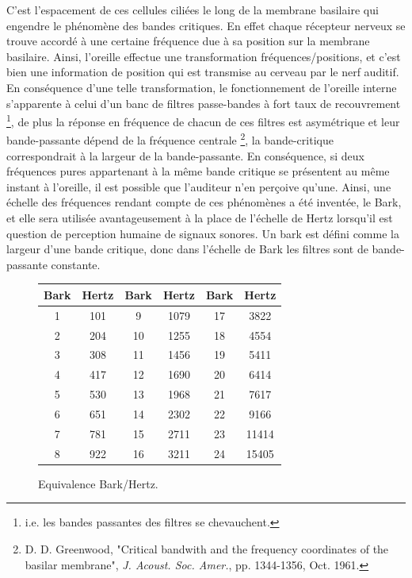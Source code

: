 C'est l'espacement de ces cellules cili{\'e}es le long de la membrane
basilaire qui engendre le ph{\'e}nom{\`e}ne des bandes critiques. En effet
chaque r{\'e}cepteur nerveux se trouve accord{\'e} {\`a} une certaine
fr{\'e}quence due {\`a} sa position sur la membrane basilaire. Ainsi,
l'oreille effectue une transformation fr{\'e}quences/positions, et
c'est bien une information de position qui est transmise au
cerveau par le nerf auditif.\\

En cons{\'e}quence d'une telle transformation, le fonctionnement de
l'oreille interne s'apparente {\`a} celui d'un banc de filtres
passe-bandes {\`a} fort taux de recouvrement \footnote{i.e. les bandes
passantes des filtres se chevauchent.}, de plus la r{\'e}ponse en
fr{\'e}quence de chacun de ces filtres est asym{\'e}trique et leur
bande-passante d{\'e}pend de la fr{\'e}quence centrale \footnote{D. D.
Greenwood, "Critical bandwith and the frequency coordinates of the
basilar membrane", \emph{J. Acoust. Soc. Amer.}, pp. 1344-1356,
Oct. 1961.}, la bande-critique correspondrait {\`a} la largeur de la
bande-passante. En cons{\'e}quence, si deux fr{\'e}quences pures
appartenant {\`a} la m{\^e}me bande critique se pr{\'e}sentent au m{\^e}me instant
{\`a} l'oreille, il est possible que l'auditeur n'en per\c{c}oive qu'une.
Ainsi, une {\'e}chelle des fr{\'e}quences rendant compte de ces ph{\'e}nom{\`e}nes
a {\'e}t{\'e} invent{\'e}e, le Bark, et elle sera utilis{\'e}e avantageusement {\`a}
la place de l'{\'e}chelle de Hertz lorsqu'il est question de
perception humaine de signaux sonores. Un bark est d{\'e}fini comme la
largeur d'une bande critique, donc dans l'{\'e}chelle
de Bark les filtres sont de bande-passante constante.\\

\begin{figure}[h]
\bigskip
\begin{center}
    \begin{tabular}{|c|c||c|c||c|c|}
        \hline
        Bark &   Hertz   &   Bark    &   Hertz   &   Bark    &   Hertz\\
        \hline
        1    &   101     &   9       &   1079    &   17      &   3822\\
        2    &   204     &   10      &   1255    &   18      &   4554\\
        3    &   308     &   11      &   1456    &   19      &   5411\\
        4    &   417     &   12      &   1690    &   20      &   6414\\
        5    &   530     &   13      &   1968    &   21      &   7617\\
        6    &   651     &   14      &   2302    &   22      &   9166\\
        7    &   781     &   15      &   2711    &   23      &   11414\\
        8    &   922     &   16      &   3211    &   24      &   15405\\
        \hline
    \end{tabular}
\end{center}
\caption{Equivalence Bark/Hertz.}
\label{tabbark2hz}
\bigskip
\end{figure}

